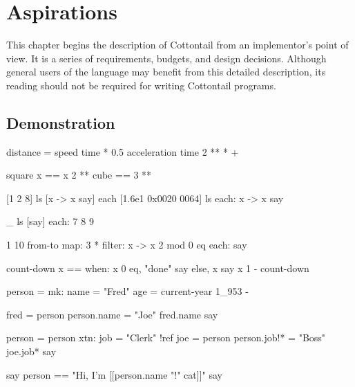 \chapter{Aspirations}

This chapter begins the description of Cottontail from an
implementor's point of view. It is a series of requirements, budgets,
and design decisions. Although general users of the language may
benefit from this detailed description, its reading should not be
required for writing Cottontail programs.


\section{Demonstration}

\begin{ccode}

distance =
  speed time *
    0.5 acceleration time 2 ** *
    +

square x == x 2 **
cube == 3 **

[1 2 8] ls
  [x -> x say] each
[1.6e1 0x0020 0064] ls
  each: x ->
    x say

_ ls [say] each:
  7 8
  9

1 10 from-to
  map: 3 *
  filter: x ->
    x 2 mod 0 eq
  each: say

count-down x ==
  when:
    x 0 eq,
      "done" say
    else,
      x say
      x 1 - count-down


person = mk:
  name = "Fred"
  age = current-year 1_953 -

fred = person
person.name = "Joe"
fred.name say

person = person xtn:
  job = "Clerk" !ref
joe = person
person.job!* = "Boss"
joe.job* say

say person ==
  "Hi, I'm [[person.name "!" cat]]" say

\end{ccode}



